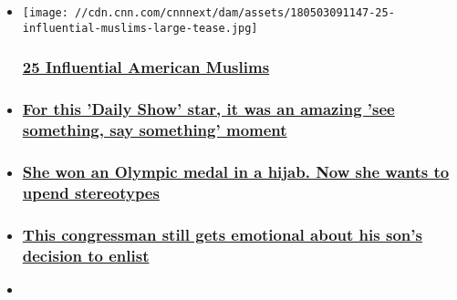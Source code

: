 \begin{itemize}
\item
  \href{http://www.cnn.com/interactive/2018/05/us/influential-muslims/}{}

  \texttt{[image: //cdn.cnn.com/cnnnext/dam/assets/180503091147-25-influential-muslims-large-tease.jpg]}

  \hypertarget{25-influential-american-muslims}{%
  \subsubsection{\texorpdfstring{\href{http://www.cnn.com/interactive/2018/05/us/influential-muslims/}{25
  Influential American
  Muslims}}{25 Influential American Muslims}}\label{25-influential-american-muslims}}
\item
  \hypertarget{for-this-daily-show-star-it-was-an-amazing-see-something-say-something-moment}{%
  \subsubsection{\texorpdfstring{\href{https://www.cnn.com/interactive/2018/05/us/influential-muslims/\#minhaj}{For
  this 'Daily Show' star, it was an amazing 'see something, say
  something'
  moment}}{For this 'Daily Show' star, it was an amazing 'see something, say something' moment}}\label{for-this-daily-show-star-it-was-an-amazing-see-something-say-something-moment}}
\item
  \hypertarget{she-won-an-olympic-medal-in-a-hijab-now-she-wants-to-upend-stereotypes}{%
  \subsubsection{\texorpdfstring{\href{https://www.cnn.com/interactive/2018/05/us/influential-muslims/\#muhammad}{She
  won an Olympic medal in a hijab. Now she wants to upend
  stereotypes}}{She won an Olympic medal in a hijab. Now she wants to upend stereotypes}}\label{she-won-an-olympic-medal-in-a-hijab-now-she-wants-to-upend-stereotypes}}
\item
  \hypertarget{this-congressman-still-gets-emotional-about-his-sons-decision-to-enlist}{%
  \subsubsection{\texorpdfstring{\href{https://www.cnn.com/interactive/2018/05/us/influential-muslims/\#ellison}{This
  congressman still gets emotional about his son's decision to
  enlist}}{This congressman still gets emotional about his son's decision to enlist}}\label{this-congressman-still-gets-emotional-about-his-sons-decision-to-enlist}}
\item
  \hypertarget{she-escaped-war-then-ran-for-office-heres-what-shed-tell-her-8-year-old-self}{%
}
\end{itemize}

